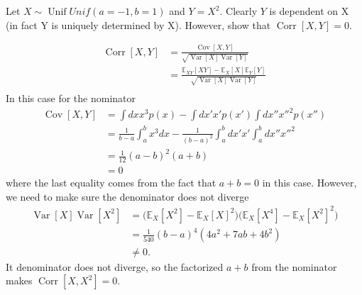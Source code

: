 \begin{example}
	Let $X\sim \operatorname{Unif}{Unif}(a=-1, b=1)$ and $Y=X^2$. Clearly $Y$ is dependent on X (in fact Y is uniquely determined by X). However, show that $\operatorname{Corr}[X,Y]=0$.
	
	\begin{equation}
		\begin{split}
			\operatorname{Corr}[X,Y] & = \frac{\operatorname{Cov}[X,Y]}{\sqrt{\operatorname{Var}[X]\operatorname{Var}[Y]}}\\
			& = \frac{\mathbb{E}_{XY}[XY]-\mathbb{E}_X[X]\mathbb{E}_Y[Y]}{\sqrt{\operatorname{Var}[X]\operatorname{Var}[Y]}}\\
		\end{split}
	\end{equation}
	In this case for the nominator
	\begin{equation}
		\begin{split}
			\operatorname{Cov}[X,Y] &= \int dx x^3 p(x)-\int dx' x'p(x')\int dx'' x''^2p(x'')\\
			&= \frac{1}{b-a}\int_{a}^{b}x^3dx-\frac{1}{(b-a)^2}\int_{a}^{b}dx' x'\int_{a}^{b}dx'' x''^2\\
			&= \frac{1}{12}(a-b)^2(a+b)\\
			&=0
		\end{split}
	\end{equation}
	where the last equality comes from the fact that $a+b = 0$ in this case. However, we need to make sure the denominator does not diverge
	\begin{equation}
		\begin{split}
			\operatorname{Var}[X]\operatorname{Var}[X^2] & =\big(\mathbb{E}_X[X^2]-\mathbb{E}_X[X]^2\big) \big(\mathbb{E}_X[X^4]-\mathbb{E}_X[X^2]^2\big)\\
			& = \frac{1}{540}(b-a)^4(4a^2+7ab+4b^2)\\
			&\neq 0.
		\end{split}
	\end{equation}
	It denominator does not diverge, so the factorized $a+b$ from the nominator makes $\operatorname{Corr}[X,X^2]=0$.
\end{example}

